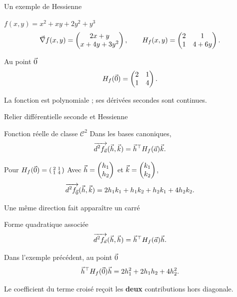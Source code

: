 \begin{frame}[t]{Un exemple de Hessienne}
\coursanalyse
\begin{exemple}{$f(x,y)=x^2+xy+2y^2+y^3$}
\[\vec\nabla f(x,y)=\begin{pmatrix}2x+y\\x+4y+3y^2\end{pmatrix},\qquad
H_f(x,y)=\begin{pmatrix}2&1\\1&4+6y\end{pmatrix}.\]
\end{exemple}
\begin{resultat}{Au point $\vec 0$}
\[H_f(\vec 0)=\begin{pmatrix}2&1\\1&4\end{pmatrix}.\]
\end{resultat}
\vfill La fonction est polynomiale ; ses dérivées secondes sont continues.
\end{frame}

\begin{frame}[t]{Relier différentielle seconde et Hessienne}
\coursanalyse
\begin{theoreme}{Fonction réelle de classe $\mathcal C^2$}
Dans les bases canoniques,
\[\overrightarrow{d^2f_{\vec a}}(\vec h,\vec k)=\vec h^{\top}H_f(\vec a)\vec k.\]
\end{theoreme}
\begin{exemple}{Pour $H_f(\vec 0)=\left(\begin{smallmatrix}2&1\\1&4\end{smallmatrix}\right)$}
Avec $\vec h=\begin{pmatrix}h_1\\h_2\end{pmatrix}$ et $\vec k=\begin{pmatrix}k_1\\k_2\end{pmatrix}$,
\[\overrightarrow{d^2f_{\vec 0}}(\vec h,\vec k)=2h_1k_1+h_1k_2+h_2k_1+4h_2k_2.\]
\end{exemple}
\end{frame}

\begin{frame}[t]{Une même direction fait apparaître un carré}
\coursanalyse
\begin{notion}{Forme quadratique associée}
\[\overrightarrow{d^2f_{\vec a}}(\vec h,\vec h)=\vec h^{\top}H_f(\vec a)\vec h.\]
\end{notion}
\begin{exemple}{Dans l’exemple précédent, au point $\vec 0$}
\[\vec h^{\top}H_f(\vec 0)\vec h
=2h_1^2+2h_1h_2+4h_2^2.\]
\end{exemple}
\vfill Le coefficient du terme croisé reçoit les \textbf{deux} contributions hors diagonale.
\end{frame}

